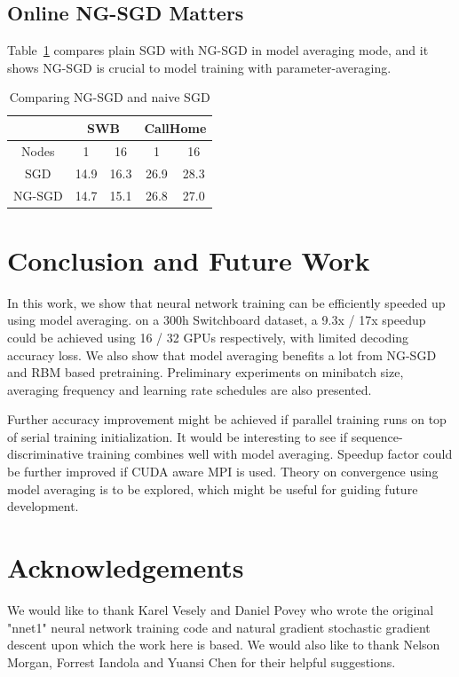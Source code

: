 \documentclass{article}
\begin{document}
\subsection{Online NG-SGD Matters}
Table~\ref{tab:ngsgd} compares plain SGD with NG-SGD in model averaging mode, and it shows NG-SGD is crucial to 
model training with parameter-averaging.
\begin{table}
  \centering
  \begin{tabular}{c|c|c|c|c}
    \hline
    & \multicolumn{2}{c|}{SWB}  & \multicolumn{2}{c}{CallHome} \\
    \hline
     Nodes  &  1    & 16        &   1   &  16 \\
    \hline
    SGD     & 14.9    & 16.3    &  26.9 & 28.3 \\
    \hline
    NG-SGD  & 14.7    & 15.1    &  26.8 & 27.0  \\
    \hline
  \end{tabular}
  \caption{Comparing NG-SGD and naive SGD}
  \label{tab:ngsgd}
\end{table}

\section{Conclusion and Future Work}
In this work, we show that neural network training can be efficiently speeded up using model averaging. 
on a 300h Switchboard dataset, a 9.3x / 17x speedup could be achieved using 16 / 32 GPUs respectively, 
with limited decoding accuracy loss. We also show that model averaging benefits a lot from NG-SGD and RBM based pretraining.
Preliminary experiments on minibatch size, averaging frequency and learning rate schedules are also presented.

Further accuracy improvement might be achieved if parallel training runs on top of serial training initialization.
It would be interesting to see if sequence-discriminative training combines well with model averaging.
Speedup factor could be further improved if CUDA aware MPI is used. Theory on convergence using model averaging is 
to be explored, which might be useful for guiding future development.

\section{Acknowledgements}
We would like to thank Karel Vesely and Daniel Povey who wrote the original "nnet1" neural network training code
and natural gradient stochastic gradient descent upon which the work here is based. We would also like to thank Nelson 
Morgan, Forrest Iandola and Yuansi Chen for their helpful suggestions. 
\end{document}

